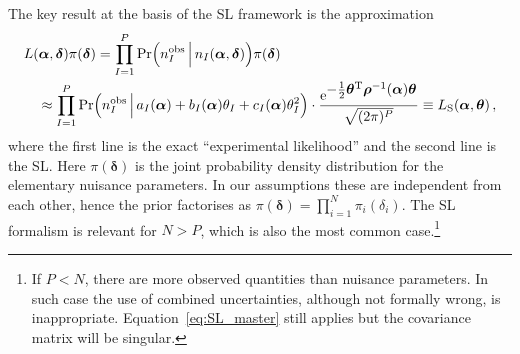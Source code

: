 \documentclass[11pt]{article}
\begin{document}
The key result at the basis of  the SL framework is the approximation
\begin{align}
  & L(\bm{\alpha},\bm{\delta} )\pi(\bm{\delta})
   = \prod_{I=1}^P \mathrm{Pr}\Big(  n^{\rm obs}_I\,\Big|\,n_I(\bm{\alpha},\bm{\delta})  \Big) \pi(\bm{\delta}) \label{eq:EL} \\
  & \quad \approx \prod_{I=1}^P \mathrm{Pr}\Big( n^{\rm obs}_I\,\Big|\,a_{I}(\bm \alpha)+b_I(\bm \alpha)\theta_I+c_I(\bm \alpha)\theta_I^2  \Big) \cdot
    \frac{ \mathrm{e}^{{\textstyle-\frac{1}{2}\bm \theta^{\rm T} \bm{\rho}^{-1}(\bm \alpha) \bm \theta}}}{\sqrt{(2\pi)^P }}  \equiv L_{\rm{S}}(\bm{\alpha},\bm{\theta})\,, \label{eq:SL_master}
\end{align}
where the first line is the exact ``experimental likelihood'' and the second line is the SL. Here $\pi(\bm \delta)$ is the joint probability density distribution for the elementary nuisance parameters. In our assumptions  these are independent from each other, hence the prior factorises as $\pi(\bm \delta)=\prod_{i=1}^N \pi_i(\delta_i)$. The SL formalism  is relevant for $N>P$, which is also the most common case.\footnote{If $P<N$, there are more observed quantities than nuisance parameters.
 In such case the use of combined uncertainties, although not formally wrong, is inappropriate.
  Equation~\eqref{eq:SL_master} still applies but the covariance matrix will be singular.
}
\end{document}
